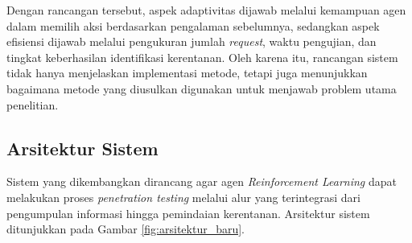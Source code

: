 Dengan rancangan tersebut, aspek adaptivitas dijawab melalui kemampuan agen dalam memilih aksi berdasarkan pengalaman sebelumnya, sedangkan aspek efisiensi dijawab melalui pengukuran jumlah \textit{request}, waktu pengujian, dan tingkat keberhasilan identifikasi kerentanan. Oleh karena itu, rancangan sistem tidak hanya menjelaskan implementasi metode, tetapi juga menunjukkan bagaimana metode yang diusulkan digunakan untuk menjawab problem utama penelitian.

\subsection{Arsitektur Sistem}
Sistem yang dikembangkan dirancang agar agen \textit{Reinforcement Learning} dapat melakukan proses \textit{penetration testing} melalui alur yang terintegrasi dari pengumpulan informasi hingga pemindaian kerentanan. Arsitektur sistem ditunjukkan pada Gambar \ref{fig:arsitektur_baru}.

